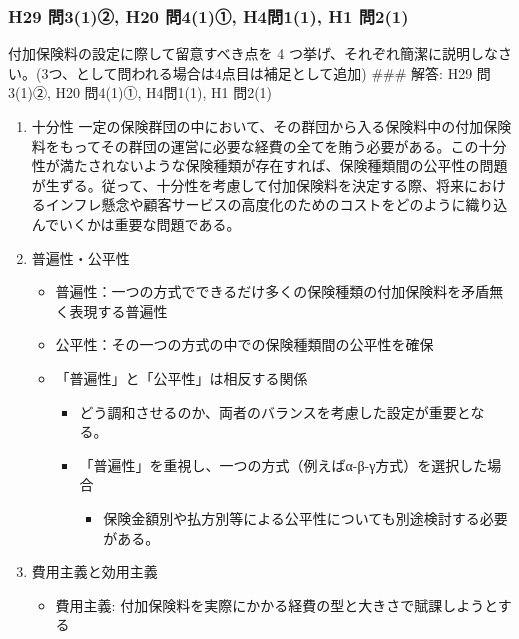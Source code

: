 \documentclass[]{article}
\begin{document}
\hypertarget{h29-ux554f31ux2461-h20-ux554f41ux2460-h4ux554f11-h1-ux554f21}{%
\subsubsection{H29 問3(1)②, H20 問4(1)①, H4問1(1), H1
問2(1)}\label{h29-ux554f31ux2461-h20-ux554f41ux2460-h4ux554f11-h1-ux554f21}}

付加保険料の設定に際して留意すべき点を 4
つ挙げ、それぞれ簡潔に説明しなさい。(3つ、として問われる場合は4点目は補足として追加)
\#\#\# 解答: H29 問3(1)②, H20 問4(1)①, H4問1(1), H1 問2(1)

\begin{enumerate}
\def\labelenumi{\arabic{enumi}.}
\tightlist
\item
  十分性
  一定の保険群団の中において、その群団から入る保険料中の付加保険料をもってその群団の運営に必要な経費の全てを賄う必要がある。この十分性が満たされないような保険種類が存在すれば、保険種類間の公平性の問題が生ずる。従って、十分性を考慮して付加保険料を決定する際、将来におけるインフレ懸念や顧客サービスの高度化のためのコストをどのように織り込んでいくかは重要な問題である。
\item
  普遍性・公平性

  \begin{itemize}
  \tightlist
  \item
    普遍性：一つの方式でできるだけ多くの保険種類の付加保険料を矛盾無く表現する普遍性
  \item
    公平性：その一つの方式の中での保険種類間の公平性を確保
  \item
    「普遍性」と「公平性」は相反する関係

    \begin{itemize}
    \tightlist
    \item
      どう調和させるのか、両者のバランスを考慮した設定が重要となる。
    \item
      「普遍性」を重視し、一つの方式（例えばα-β-γ方式）を選択した場合

      \begin{itemize}
      \tightlist
      \item
        保険金額別や払方別等による公平性についても別途検討する必要がある。
      \end{itemize}
    \end{itemize}
  \end{itemize}
\item
  費用主義と効用主義

  \begin{itemize}
  \tightlist
  \item
    費用主義: 付加保険料を実際にかかる経費の型と大きさで賦課しようとする


\end{itemize}
\end{enumerate}
\end{document}
